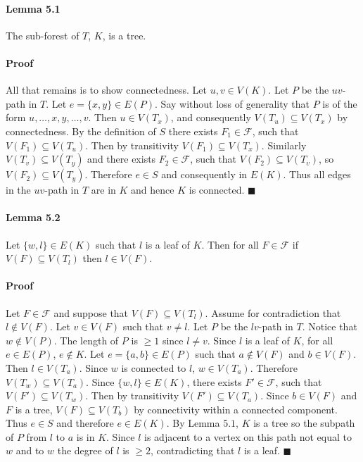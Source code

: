 \documentclass[letterpaper,12pt,oneside,onecolumn]{report}
\begin{document}
\paragraph{Lemma 5.1}
The sub-forest of $T$, $K$, is a tree.
\paragraph{Proof}
All that remains is to show connectedness. Let $u,v \in V(K)$. Let $P$ be the $uv$-path in $T$. Let $e=\{x,y\} \in E(P)$. Say without loss of generality that $P$ is of the form $u,\dots,x,y,\dots,v$. Then $u \in V(T_x)$, and consequently $V(T_u) \subseteq V(T_x)$ by connectedness. By the definition of $S$ there exists $F_1 \in \mathcal{F}$, such that $V(F_1) \subseteq V(T_u)$. Then by transitivity $V(F_1) \subseteq V(T_x)$. Similarly $V(T_v) \subseteq V(T_y)$ and there exists $F_2 \in \mathcal{F}$, such that $V(F_2) \subseteq V(T_v)$, so $V(F_2) \subseteq V(T_y)$. Therefore $e \in S$ and consequently in $E(K)$. Thus all edges in the $uv$-path in $T$ are in $K$ and hence $K$ is connected. $\blacksquare$
\paragraph{Lemma 5.2}
Let $\{w, l\} \in E(K)$ such that $l$ is a leaf of $K$. Then for all $F \in \mathcal{F}$ if $V(F) \subseteq V(T_l)$ then $l \in V(F)$.
\paragraph{Proof}
Let $F \in \mathcal{F}$ and suppose that $V(F) \subseteq V(T_l)$. Assume for contradiction that $l \not\in V(F)$. Let $v \in V(F)$ such that $v \neq l$. Let $P$ be the $lv$-path in $T$. Notice that $w \not\in V(P)$. The length of $P$ is $\geq 1$ since $l \neq v$. Since $l$ is a leaf of $K$, for all $e \in E(P)$, $e \not\in K$. Let $e = \{a,b\} \in E(P)$ such that $a \not\in V(F)$ and $b \in V(F)$. Then $l \in V(T_a)$. Since $w$ is connected to $l$, $w \in V(T_a)$. Therefore $V(T_w) \subseteq V(T_a)$. Since $\{w, l\} \in E(K)$, there exists $F' \in \mathcal{F}$, such that $V(F') \subseteq V(T_w)$. Then by transitivity $V(F') \subseteq V(T_a)$. Since $b \in V(F)$ and $F$ is a tree, $V(F) \subseteq V(T_b)$ by connectivity within a connected component. Thus $e \in S$ and therefore $e \in E(K)$. By Lemma $5.1$, $K$ is a tree so the subpath of $P$ from $l$ to $a$ is in $K$. Since $l$ is adjacent to a vertex on this path not equal to $w$ and to $w$ the degree of $l$ is $\geq 2$, contradicting that $l$ is a leaf. $\blacksquare$
\end{document}
